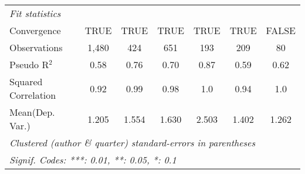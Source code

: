 \begin{tabular}{lcccccc}
   \midrule
   \emph{Fit statistics}\\
   Convergence                                                &TRUE           & TRUE         & TRUE         & TRUE        & TRUE         & FALSE\\  
   Observations                                               & 1,480         & 424          & 651          & 193         & 209          & 80\\  
   Pseudo R$^2$                                               & 0.58          & 0.76         & 0.70         & 0.87        & 0.59         & 0.62\\  
   Squared Correlation                                        & 0.92          & 0.99         & 0.98         & 1.0         & 0.94         & 1.0\\  
Mean(Dep. Var.) & 1.205 & 1.554 & 1.630 & 2.503 & 1.402 & 1.262 \\
   \midrule \midrule
   \multicolumn{7}{l}{\emph{Clustered (author \& quarter) standard-errors in parentheses}}\\
   \multicolumn{7}{l}{\emph{Signif. Codes: ***: 0.01, **: 0.05, *: 0.1}}\\
\end{tabular}
\par\endgroup
